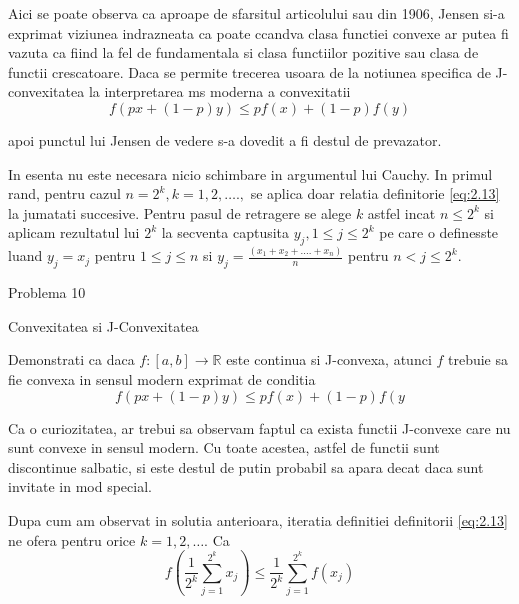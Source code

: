 \documentclass[a4paper,12pt,oneside]{report}
\begin{document}
Aici se poate observa ca aproape de sfarsitul articolului sau din 1906, Jensen si-a exprimat viziunea indrazneata ca poate ccandva clasa functiei convexe ar putea fi vazuta ca fiind la fel de fundamentala si clasa functiilor pozitive sau clasa de functii crescatoare. Daca se permite trecerea usoara de la notiunea specifica de J-convexitatea la interpretarea ms moderna a convexitatii 
\begin{displaymath}
  f\left ( px + \left ( 1 - p \right )y \right )\leq pf\left ( x \right ) + \left ( 1-p \right )f\left ( y \right)
\end{displaymath} 

apoi punctul lui Jensen de vedere s-a dovedit a fi destul de prevazator. 

In esenta nu este necesara nicio schimbare in argumentul lui Cauchy. In primul rand, pentru cazul \(n = 2^{k}, k=1,2,….,\)  se aplica doar relatia definitorie \ref{eq:2.13} la jumatati succesive. Pentru pasul de retragere se alege \(k\) astfel incat \(n\leq 2^{k}\) si aplicam rezultatul lui \(2^{k}\) la secventa captusita \(y_{j} , 1\leq j\leq 2^{k}\) pe care o definesste luand \(y_{j} = x_{j}\) pentru \(1\leq j\leq n \) si \(y_{j} = \frac{\left ( x_{1} + x_{2} + ....+ x_{n} \right )}{n}\) pentru \(n< j\leq 2^{k}\). 


Problema 10

Convexitatea si J-Convexitatea 

Demonstrati ca daca \(f : \left [ a,b \right ]\rightarrow \mathbb{R} \) este continua si J-convexa, atunci \(f\) trebuie sa fie convexa in sensul modern exprimat de conditia 
\begin{displaymath}
  f\left ( px + \left ( 1 - p \right )y \right )\leq pf\left ( x \right ) + \left ( 1-p \right )f\left ( y \right.
\end{displaymath}
 
Ca o curiozitatea, ar trebui sa observam faptul ca exista functii J-convexe care nu sunt convexe in sensul modern. Cu toate acestea, astfel de functii sunt discontinue salbatic, si este destul de putin probabil sa apara decat daca sunt invitate in mod special. 

Dupa cum am observat in solutia anterioara, iteratia definitiei definitorii \ref{eq:2.13} ne ofera pentru orice \(k = 1,2,….\) Ca 
\begin{displaymath}
  f\left ( \frac{1}{2^{k}} \sum_{j = 1}^{2^{k}}x_{j}\right ) \leq  \frac{1}{2^{k}}\sum_{j = 1}^{2^{k}}f\left ( x_{j}\right )
\end{displaymath}
\end{document}
